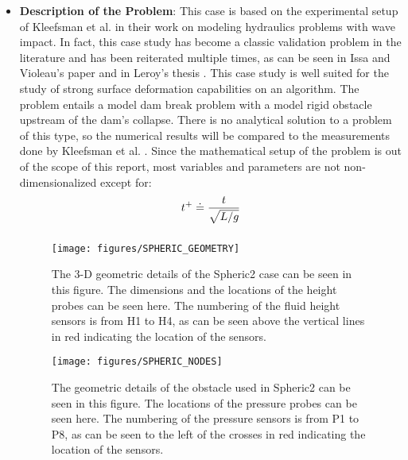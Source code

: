 \documentclass{../GPUSPHtemplate}
\begin{document}
\begin{itemize}
\item \textbf{Description of the Problem}: This case is based on the experimental setup of Kleefsman et al. \citep{Kleefsman}
  in their work on modeling hydraulics problems with wave impact.
  In fact, this case study has become a classic validation problem in the literature and has been reiterated multiple times,
  as can be seen in Issa and Violeau's paper \citep{SPHERIC} and in Leroy's thesis \citep{AgnesLeroy}. This case study is well
  suited for the study of strong surface deformation capabilities on an algorithm. The problem entails a model dam break
  problem with a model rigid obstacle upstream of the dam's collapse. There is no analytical solution to a problem of this type,
  so the numerical results will be compared to the measurements done by Kleefsman et al. \citep{Kleefsman}.
  Since the mathematical setup of the problem is out of the scope of this report, most variables and parameters are not non-dimensionalized except for: 
  \begin{equation}
    \begin{array}{l}
      \displaystyle{  t^{+} \doteq \frac{t}{\sqrt{L/g}} } \medskip \\ 
    \end{array}
    \end{equation}  

  \begin{figure}[h!]
    \texttt{[image: figures/SPHERIC\_GEOMETRY]}
    \centering
    \caption{ The 3-D geometric details of the Spheric2 case can be seen in this figure. The dimensions and the locations of the height probes can be seen here. The numbering of the fluid height sensors is from H1 to H4, as can be seen above the vertical lines in red indicating the location of the sensors.}
    \label{fig:SphericGeometry}
  \end{figure}
  
  \begin{figure}[h!]
    \texttt{[image: figures/SPHERIC\_NODES]}
    \centering
    \caption{ The geometric details of the obstacle used in Spheric2 can be seen in this figure. The locations of the pressure probes can be seen here. The numbering of the pressure sensors is from P1 to P8, as can be seen to the left of the crosses in red indicating the location of the sensors.}
    \label{fig:Spheric_Nodes}
  \end{figure}
  

\end{itemize}
\end{document}
